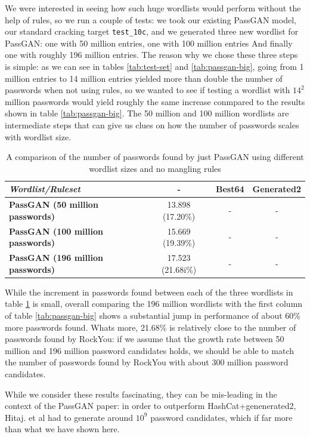 We were interested in seeing how such huge wordlists would perform without the help of rules, so we run a couple of tests: we took our existing PassGAN model, our standard cracking target \texttt{test\_10c}, and we generated three new wordlist for PassGAN: one with 50 million entries, one with 100 million entries And finally one with roughly 196 million entries. 
The reason why we chose these three steps is simple: as we can see in tables \ref{tab:test-set} and \ref{tab:passgan-big}, going from 1 million entries to 14 million entries yielded more than double the number of passwords when not using rules, so we wanted to see if testing a wordlist with $14^2$ million passwords would yield roughly the same increase conmpared to the results shown in table \ref{tab:passgan-big}. The 50 million and 100 million wordlists are intermediate steps that can give us clues on how the number of passwords scales with wordlist size.

\begin{table}[H]
\centering    
\begin{tabular}{|l|c|c|c|}
\hline
\textbf{\emph{Wordlist/Ruleset}} & \textbf{-} & \textbf{Best64} & \textbf{Generated2} \\ \hline
\textbf{PassGAN (50 million passwords)}          & 13.898 (17.20\%) & - & - \\ \hline
\textbf{PassGAN (100 million passwords)}          & 15.669 (19.39\%) & - & - \\ \hline
\textbf{PassGAN (196 million passwords)}          & 17.523 (21.68i\%) & - & - \\ \hline
\end{tabular}
\caption{A comparison of the number of passwords found by just PassGAN using different wordlist sizes and no mangling rules} 
\label{tab:passgan-huge}
\end{table}

While the increment in passwords found between each of the three wordlists in table \ref{tab:passgan-huge} is small, overall comparing the 196 million wordlists with the first column of table \ref{tab:passgan-big} shows a substantial jump in performance of about 60\% more passwords found.
Whats more, 21.68\% is relatively close to the number of passwords found by RockYou: if we assume that the growth rate between 50 million and 196 million password candidates holds, we should be able to match the number of passwords found by RockYou with about 300 million password candidates.

While we consider these results fascinating, they can be mis-leading in the context of the PassGAN paper: in order to outperform HashCat+genenerated2, Hitaj. et al had to generate around $10^{9}$ password candidates, which if far more than what we have shown here.


